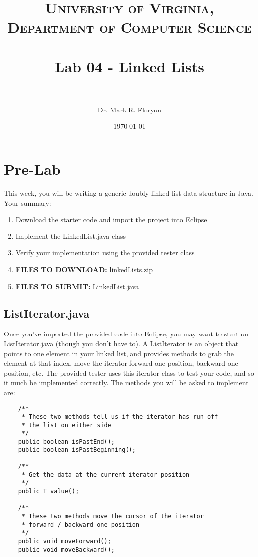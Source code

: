 \documentclass[paper=a4, fontsize=11pt, parskip=full]{scrartcl} %
\title{
\normalfont \normalsize
\textsc{University of Virginia, Department of Computer Science} \\ [25pt] %
\horrule{0.5pt} \\[0.4cm] %
\huge Lab 04 - Linked Lists \\ %
\horrule{2pt} \\[0.5cm] %
}
\author{Dr. Mark R. Floryan} %
\date{\normalsize\today} %
\numberwithin{equation}{section} %
\numberwithin{figure}{section} %
\numberwithin{table}{section} %
\begin{document}
\maketitle %


\section{Pre-Lab}

This week, you will be writing a generic doubly-linked list data structure in Java. Your summary:

\begin{enumerate}
	\item Download the starter code and import the project into Eclipse
	\item Implement the LinkedList.java class
	\item Verify your implementation using the provided tester class
	\item \textbf{FILES TO DOWNLOAD:} linkedLists.zip
	\item \textbf{FILES TO SUBMIT:} LinkedList.java
\end{enumerate}


\subsection{ListIterator.java}

Once you've imported the provided code into Eclipse, you may want to start on ListIterator.java (though you don't have to). A ListIterator is an object that points to one element in your linked list, and provides methods to grab the element at that index, move the iterator forward one position, backward one position, etc. The provided tester uses this iterator class to test your code, and so it much be implemented correctly. The methods you will be asked to implement are:

\begin{lstlisting}
	/**
	 * These two methods tell us if the iterator has run off
	 * the list on either side
	 */
	public boolean isPastEnd();
	public boolean isPastBeginning();

	/**
	 * Get the data at the current iterator position
	 */
	public T value();

	/**
	 * These two methods move the cursor of the iterator
	 * forward / backward one position
	 */
	public void moveForward();
	public void moveBackward();
\end{lstlisting}
\end{document}
